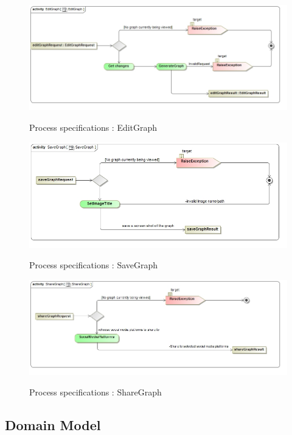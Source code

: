 \documentclass[a4paper,12pt]{article}
\begin{document}
		\begin{figure}[H]
		\includegraphics[width=\textwidth]{Images/act__EditGraph}  \\
		\caption{Process specifications : EditGraph}
	\end{figure}
	
	\begin{figure}[H]
		\includegraphics[width=\textwidth]{Images/act__SaveGraph}  \\
		\caption{Process specifications : SaveGraph}
	\end{figure}
	
	\begin{figure}[H]
		\includegraphics[width=\textwidth]{Images/act__ShareGraph}  \\
		\caption{Process specifications : ShareGraph}
	\end{figure}

\subsection{Domain Model}
\end{document}
